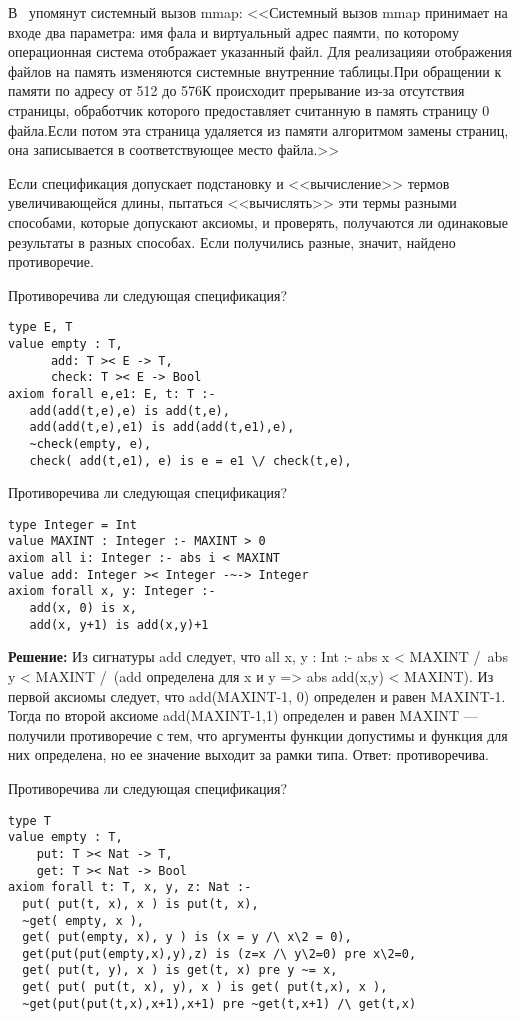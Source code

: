 \z В~\cite{tanenbaum_os} упомянут системный вызов mmap: <<Системный вызов mmap принимает на входе два параметра: имя фала и виртуальный адрес паямти, по которому операционная система отображает указанный файл. Для реализацияи отображения файлов на память изменяются системные внутренние таблицы.При обращении к памяти по адресу от 512 до 576К происходит прерывание из-за отсутствия страницы, обработчик которого предоставляет считанную в память страницу 0 файла.Если потом эта страница удаляется из памяти алгоритмом замены страниц, она записывается в соответствующее место файла.>>


Если спецификация допускает подстановку и <<вычисление>> термов увеличивающейся длины, пытаться <<вычислять>> эти термы разными способами, которые допускают аксиомы, и проверять, получаются ли одинаковые результаты в разных способах. Если получились разные, значит, найдено противоречие.

\z Противоречива ли следующая спецификация?
\begin{lstlisting}
type E, T
value empty : T,
      add: T >< E -> T,
      check: T >< E -> Bool
axiom forall e,e1: E, t: T :-
   add(add(t,e),e) is add(t,e),
   add(add(t,e),e1) is add(add(t,e1),e),
   ~check(empty, e),
   check( add(t,e1), e) is e = e1 \/ check(t,e),
\end{lstlisting}


\z Противоречива ли следующая спецификация?
\begin{lstlisting}
type Integer = Int
value MAXINT : Integer :- MAXINT > 0
axiom all i: Integer :- abs i < MAXINT
value add: Integer >< Integer -~-> Integer
axiom forall x, y: Integer :-
   add(x, 0) is x,
   add(x, y+1) is add(x,y)+1
\end{lstlisting}

\textbf{Решение:}
Из сигнатуры add следует, что all x, y : Int :- abs x < MAXINT /\ abs y < MAXINT /\ (add определена для x и y => abs add(x,y) < MAXINT). Из первой аксиомы следует, что add(MAXINT-1, 0) определен и равен MAXINT-1. Тогда по второй аксиоме add(MAXINT-1,1) определен и равен MAXINT --- получили противоречие с тем, что аргументы функции допустимы и функция для них определена, но ее значение выходит за рамки типа. Ответ: противоречива.

\z Противоречива ли следующая спецификация?
\begin{lstlisting}
type T
value empty : T,
    put: T >< Nat -> T,
    get: T >< Nat -> Bool
axiom forall t: T, x, y, z: Nat :-
  put( put(t, x), x ) is put(t, x),
  ~get( empty, x ),
  get( put(empty, x), y ) is (x = y /\ x\2 = 0),
  get(put(put(empty,x),y),z) is (z=x /\ y\2=0) pre x\2=0,
  get( put(t, y), x ) is get(t, x) pre y ~= x,
  get( put( put(t, x), y), x ) is get( put(t,x), x ),
  ~get(put(put(t,x),x+1),x+1) pre ~get(t,x+1) /\ get(t,x)
\end{lstlisting}


